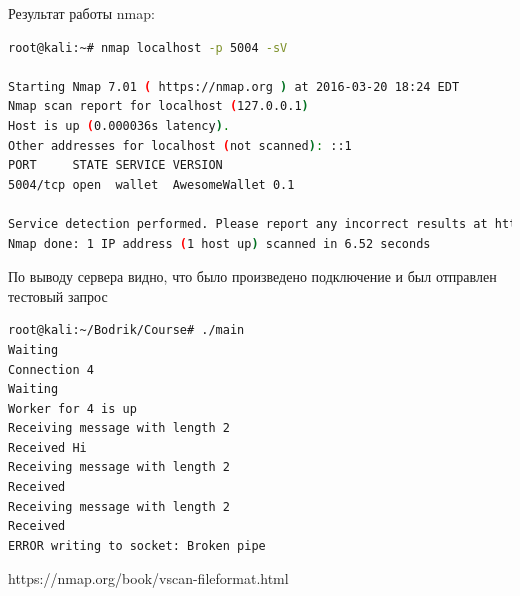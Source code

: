 Результат работы nmap:

\begin{lstlisting}[language=bash]
root@kali:~# nmap localhost -p 5004 -sV

Starting Nmap 7.01 ( https://nmap.org ) at 2016-03-20 18:24 EDT
Nmap scan report for localhost (127.0.0.1)
Host is up (0.000036s latency).
Other addresses for localhost (not scanned): ::1
PORT     STATE SERVICE VERSION
5004/tcp open  wallet  AwesomeWallet 0.1

Service detection performed. Please report any incorrect results at https://nmap.org/submit/ .
Nmap done: 1 IP address (1 host up) scanned in 6.52 seconds
\end{lstlisting}

По выводу сервера видно, что было произведено подключение и был отправлен тестовый запрос

\begin{lstlisting}[language=bash]
root@kali:~/Bodrik/Course# ./main 
Waiting
Connection 4
Waiting
Worker for 4 is up
Receiving message with length 2
Received Hi
Receiving message with length 2
Received 
Receiving message with length 2
Received 
ERROR writing to socket: Broken pipe
\end{lstlisting}

https://nmap.org/book/vscan-fileformat.html